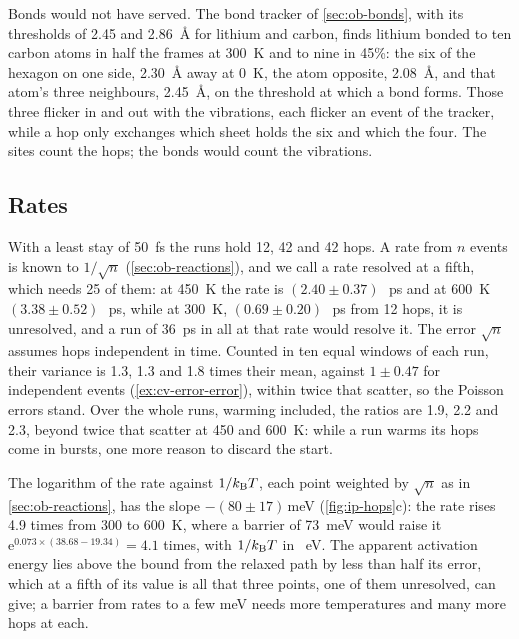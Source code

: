 Bonds would not have served. The bond tracker of \cref{sec:ob-bonds},
with its thresholds of 2.45 and \SI{2.86}{\angstrom} for lithium and
carbon, finds lithium bonded to ten carbon atoms in half the frames at
\SI{300}{\kelvin} and to nine in 45\%: the six of the hexagon on one
side, \SI{2.30}{\angstrom} away at \SI{0}{\kelvin}, the atom opposite,
\SI{2.08}{\angstrom}, and that atom's three neighbours,
\SI{2.45}{\angstrom}, on the threshold at which a bond forms. Those three
flicker in and out with the vibrations, each flicker an event of the
tracker, while a hop only exchanges which sheet holds the six and which
the four. The sites count the hops; the bonds would count the
vibrations.

\subsection*{Rates}

With a least stay of \SI{50}{\femto\second} the runs hold 12, 42 and 42
hops. A rate from $n$ events is known to $1/\sqrt n$
(\cref{sec:ob-reactions}), and we call a rate resolved at a fifth, which
needs 25 of them: at \SI{450}{\kelvin} the rate is $(2.40 \pm
0.37)$\,\si{\per\pico\second} and at \SI{600}{\kelvin} $(3.38 \pm
0.52)$\,\si{\per\pico\second}, while at \SI{300}{\kelvin}, $(0.69 \pm
0.20)$\,\si{\per\pico\second} from 12 hops, it is unresolved, and a run of
\SI{36}{\pico\second} in all at that rate would resolve it. The error
$\sqrt n$ assumes hops independent in time. Counted in ten equal windows
of each run, their variance is 1.3, 1.3 and 1.8 times their mean, against
$1 \pm 0.47$ for independent events (\cref{ex:cv-error-error}), within
twice that scatter, so the Poisson errors stand. Over the whole runs,
warming included, the ratios are 1.9, 2.2 and 2.3, beyond twice that
scatter at 450 and \SI{600}{\kelvin}: while a run warms its hops come in
bursts, one more reason to discard the start.

The logarithm of the rate against $1/k_{\mathrm{B}} T$, each point weighted by $\sqrt
n$ as in \cref{sec:ob-reactions}, has the slope $-(80 \pm
17)$\,\si{\milli\electronvolt} (\cref{fig:ip-hops}c): the rate rises 4.9
times from 300 to \SI{600}{\kelvin}, where a barrier of
\SI{73}{\milli\electronvolt} would raise it $\mathrm{e}^{0.073\times(38.68
- 19.34)} = 4.1$ times, with $1/k_{\mathrm{B}} T$ in \si{\per\electronvolt}. The
apparent activation energy lies above the bound from the relaxed path by
less than half its error, which at a fifth of its value is all that three
points, one of them unresolved, can give; a barrier from rates to a few
\si{\milli\electronvolt} needs more temperatures and many more hops at
each.

